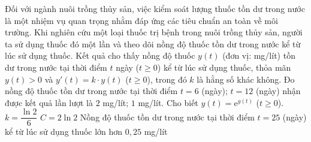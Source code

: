 \begin{ex}%
	Đối với ngành nuôi trồng thủy sản, việc kiểm soát lượng thuốc tồn dư trong nước là một nhiệm vụ quan trọng nhằm đáp ứng các tiêu chuẩn an toàn về môi trường. Khi nghiên cứu một loại thuốc trị bệnh trong nuôi trồng thủy sản, người ta sử dụng thuốc đó một lần và theo dõi nồng độ thuốc tồn dư trong nước kể từ lúc sử dụng thuốc. Kết quả cho thấy nồng độ thuốc $y(t)$ (đơn vị: mg/lít) tồn dư trong nước tại thời điểm $t$ ngày ($t\geq 0$) kể từ lúc sử dụng thuốc, thỏa mãn $y(t) > 0$ và $y'(t)=k\cdot y(t)$ ($t\geq 0$), trong đó $k$ là hằng số khác không. Đo nồng độ thuốc tồn dư trong nước tại thời điểm $t=6$ (ngày); $t=12$ (ngày) nhận được kết quả lần lượt là $2$ mg/lít; $1$ mg/lít. Cho biết $y(t)=\mathrm{e}^{g(t)}$ ($t\geq 0$).
	{$k=\dfrac{\ln 2}{6}$}
	{\True $C=2\ln 2$}
	{Nồng độ thuốc tồn dư trong nước tại thời điểm $t=25$ (ngày) kể từ lúc sử dụng thuốc lớn hơn $0{,}25$ mg/lít}
\end{ex}

